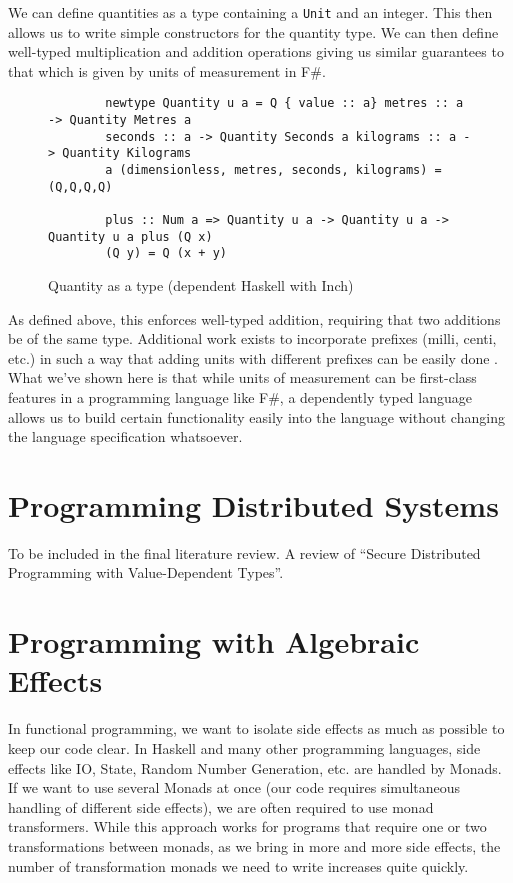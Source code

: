 We can define quantities as a type containing a \texttt{Unit} and an integer.
 This then allows us to write simple constructors for the quantity type. We can
 then define well-typed multiplication and addition operations giving us similar
 guarantees to that which is given by units of measurement in F\#. 

\begin{figure}[h]
    \caption{Quantity as a type (dependent Haskell with Inch) \cite{gundry2013}}
    \begin{lstlisting}
        newtype Quantity u a = Q { value :: a} metres :: a -> Quantity Metres a
        seconds :: a -> Quantity Seconds a kilograms :: a -> Quantity Kilograms
        a (dimensionless, metres, seconds, kilograms) = (Q,Q,Q,Q)

        plus :: Num a => Quantity u a -> Quantity u a -> Quantity u a plus (Q x)
        (Q y) = Q (x + y)
    \end{lstlisting}
\end{figure}

As defined above, this enforces well-typed addition, requiring that two
additions be of the same type. Additional work exists to incorporate prefixes
(milli, centi, etc.) in such a way that adding units with different prefixes can
be easily done \cite{gundry2013}. What we've shown here is that while units of
measurement can be first-class features in a programming language like F\#, a
dependently typed language allows us to build certain functionality easily into
the language without changing the language specification whatsoever. 

\section{Programming Distributed Systems}

To be included in the final literature review. A review of ``Secure Distributed
Programming with Value-Dependent Types''. \cite{fstar_distributed_programming}

\section{Programming with Algebraic Effects}

In functional programming, we want to isolate side effects as much as possible
to keep our code clear. In Haskell and many other programming languages, side
effects like IO, State, Random Number Generation, etc. are handled by Monads. If
we want to use several Monads at once (our code requires simultaneous handling
of different side effects), we are often required to use monad transformers.
While this approach works for programs that require one or two transformations
between monads, as we bring in more and more side effects, the number of
transformation monads we need to write increases quite quickly. 

